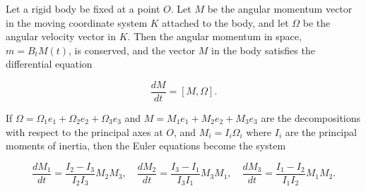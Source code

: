 Let a rigid body be fixed at a point $O$. Let $M$ be the angular momentum vector in the moving coordinate system $K$ attached to the body, and let $\Omega$ be the angular velocity vector in $K$. Then the angular momentum in space, $m = B_t M(t)$, is conserved, and the vector $M$ in the body satisfies the differential equation

$$\frac{dM}{dt} = [M, \Omega].$$

If $\Omega = \Omega_1 e_1 + \Omega_2 e_2 + \Omega_3 e_3$ and $M = M_1 e_1 + M_2 e_2 + M_3 e_3$ are the decompositions with respect to the principal axes at $O$, and $M_i = I_i \Omega_i$ where $I_i$ are the principal moments of inertia, then the Euler equations become the system

$$\frac{dM_1}{dt} = \frac{I_2 - I_3}{I_2 I_3} M_2 M_3, \quad \frac{dM_2}{dt} = \frac{I_3 - I_1}{I_3 I_1} M_3 M_1, \quad \frac{dM_3}{dt} = \frac{I_1 - I_2}{I_1 I_2} M_1 M_2.$$
